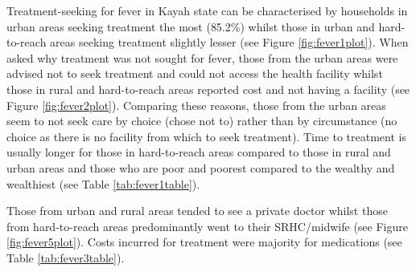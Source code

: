 \documentclass[12pt,a4paper]{article}
\begin{document}
Treatment-seeking for fever in Kayah state can be characterised by households in urban areas seeking treatment the most (85.2\%) whilst those in urban and hard-to-reach areas seeking treatment slightly lesser (see Figure \ref{fig:fever1plot}). When asked why treatment was not sought for fever, those from the urban areas were advised not to seek treatment and could not access the health facility whilst those in rural and hard-to-reach areas reported cost and not having a facility (see Figure \ref{fig:fever2plot}). Comparing these reasons, those from the urban areas seem to not seek care by choice (chose not to) rather than by circumstance (no choice as there is no facility from which to seek treatment). Time to treatment is usually longer for those in hard-to-reach areas compared to those in rural and urban areas and those who are poor and poorest compared to the wealthy and wealthiest (see Table \ref{tab:fever1table}).

Those from urban and rural areas tended to see a private doctor whilst those from hard-to-reach areas predominantly went to their SRHC/midwife (see Figure \ref{fig:fever5plot}). Costs incurred for treatment were majority for medications (see Table \ref{tab:fever3table}).
\end{document}
